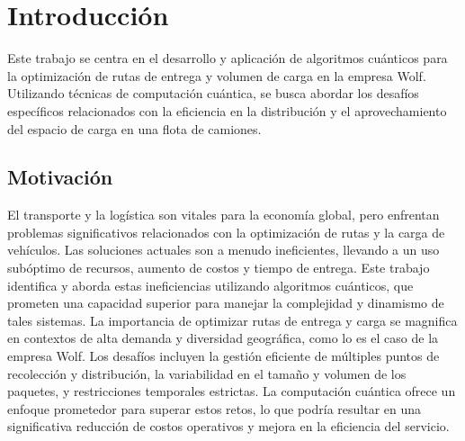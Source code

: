 \chapter{Introducción}

Este trabajo se centra en el desarrollo y aplicación de algoritmos cuánticos para la optimización de rutas de entrega y volumen de carga en la empresa Wolf. Utilizando técnicas de computación cuántica, se busca abordar los desafíos específicos relacionados con la eficiencia en la distribución y el aprovechamiento del espacio de carga en una flota de camiones. 


\section{Motivación}

    El transporte y la logística son vitales para la economía global, pero enfrentan problemas significativos relacionados con la optimización de rutas y la carga de vehículos. Las soluciones actuales son a menudo ineficientes, llevando a un uso subóptimo de recursos, aumento de costos y tiempo de entrega. Este trabajo identifica y aborda estas ineficiencias utilizando algoritmos cuánticos, que prometen una capacidad superior para manejar la complejidad y dinamismo de tales sistemas.
    La importancia de optimizar rutas de entrega y carga se magnifica en contextos de alta demanda y diversidad geográfica, como lo es el caso de la empresa Wolf. Los desafíos incluyen la gestión eficiente de múltiples puntos de recolección y distribución, la variabilidad en el tamaño y volumen de los paquetes, y restricciones temporales estrictas. La computación cuántica ofrece un enfoque prometedor para superar estos retos, lo que podría resultar en una significativa reducción de costos operativos y mejora en la eficiencia del servicio.


